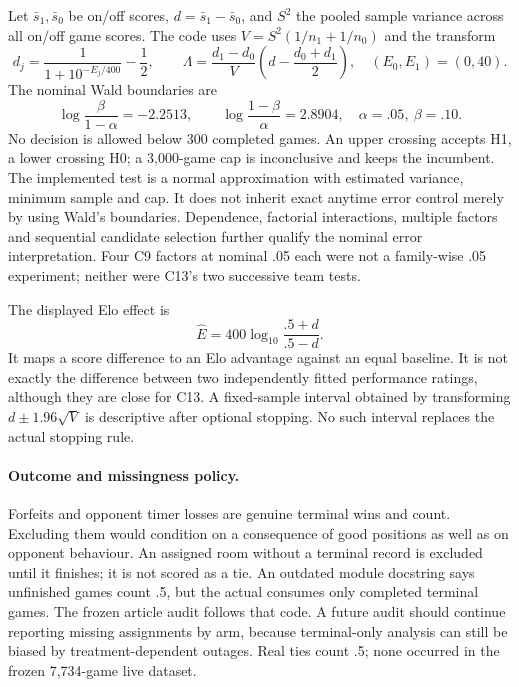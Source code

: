 Let $\bar s_1,\bar s_0$ be on/off scores, $d=\bar s_1-\bar s_0$, and
$S^2$ the pooled sample variance across all on/off game scores. The code uses
$V=S^2(1/n_1+1/n_0)$ and the transform
\begin{equation}
  d_j=\frac{1}{1+10^{-E_j/400}}-\frac12,\qquad
  \Lambda=\frac{d_1-d_0}{V}
    \left(d-\frac{d_0+d_1}{2}\right),
  \quad (E_0,E_1)=(0,40).
  \label{eq:live-llr}
\end{equation}
The nominal Wald boundaries \citep{wald1945} are
\begin{equation}
  \log\frac{\beta}{1-\alpha}=-2.2513,\qquad
  \log\frac{1-\beta}{\alpha}=2.8904,
  \quad\alpha=.05,\ \beta=.10.
\end{equation}
No decision is allowed below 300 completed games. An upper crossing accepts
H1, a lower crossing H0; a 3,000-game cap is inconclusive and keeps the
incumbent. The implemented test is a normal approximation with estimated
variance, minimum sample and cap. It does not inherit exact anytime error
control merely by using Wald's boundaries. Dependence, factorial interactions,
multiple factors and sequential candidate selection further qualify the
nominal error interpretation. Four C9 factors at nominal .05 each were not
a family-wise .05 experiment; neither were C13's two successive team tests.

The displayed Elo effect is
\begin{equation}
  \widehat E=400\log_{10}\frac{.5+d}{.5-d}.
  \label{eq:effect-transform}
\end{equation}
It maps a score difference to an Elo advantage against an equal baseline.
It is not exactly the difference between two independently fitted performance
ratings, although they are close for C13. A fixed-sample interval obtained
by transforming $d\pm1.96\sqrt V$ is descriptive after optional stopping.
No such interval replaces the actual stopping rule.

\paragraph{Outcome and missingness policy.}
Forfeits and opponent timer losses are genuine terminal wins and count.
Excluding them would condition on a consequence of good positions as well as
on opponent behaviour. An assigned room without a terminal record is
excluded until it finishes; it is not scored as a tie. An outdated module
docstring says unfinished games count .5, but the actual  consumes
only completed terminal games. The frozen article audit follows that code.
A future audit should continue reporting missing assignments by arm, because
terminal-only analysis can still be biased by treatment-dependent outages.
Real ties count .5; none occurred in the frozen 7,734-game live dataset.

